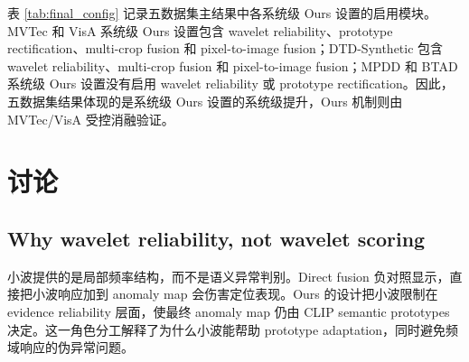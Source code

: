 \documentclass[10pt,a4paper,fontset=none]{ctexart}
\begin{document}
\begin{table}[t]
\centering
\caption{五数据集系统级 Ours 设置配置审计。该表用于限定因果归因。}
\label{tab:final_config}
\end{table}

表 \ref{tab:final_config} 记录五数据集主结果中各系统级 Ours 设置的启用模块。MVTec 和 VisA 系统级 Ours 设置包含 wavelet reliability、prototype rectification、multi-crop fusion 和 pixel-to-image fusion；DTD-Synthetic 包含 wavelet reliability、multi-crop fusion 和 pixel-to-image fusion；MPDD 和 BTAD 系统级 Ours 设置没有启用 wavelet reliability 或 prototype rectification。因此，五数据集结果体现的是系统级 Ours 设置的系统级提升，Ours 机制则由 MVTec/VisA 受控消融验证。

\section{讨论}

\subsection{Why wavelet reliability, not wavelet scoring}

小波提供的是局部频率结构，而不是语义异常判别。Direct fusion 负对照显示，直接把小波响应加到 anomaly map 会伤害定位表现。Ours 的设计把小波限制在 evidence reliability 层面，使最终 anomaly map 仍由 CLIP semantic prototypes 决定。这一角色分工解释了为什么小波能帮助 prototype adaptation，同时避免频域响应的伪异常问题。
\end{document}
